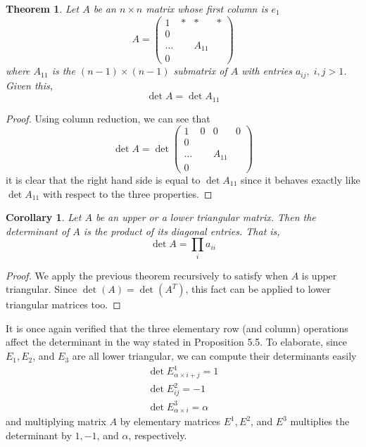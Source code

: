 \documentclass{article}
\newtheorem{theorem}{Theorem}[section]
\newtheorem{corollary}{Corollary}[theorem]
\theoremstyle{remark}
\theoremstyle{definition}
\begin{document}
\begin{theorem}
Let $A$ be an $n \times n$ matrix whose first column is $e_1$
\[A = \begin{pmatrix}
1&*&*&* \\
0 &&& \\
\ldots& & A_{11}& \\
0&&&
\end{pmatrix}\]
where $A_{11}$ is the $(n-1) \times (n-1)$ submatrix of $A$ with entries $a_{i j}, \; i, j > 1$. Given this, 
\[\det{A} = \det{A_{11}}\]
\end{theorem}
\begin{proof}
Using column reduction, we can see that 
\[ \det{A} = \det{\begin{pmatrix}
1&0&0&0 \\
0 &&& \\
\ldots& & A_{11}& \\
0&&&
\end{pmatrix}}\]
it is clear that the right hand side is equal to $\det{A_{11}}$ since it behaves exactly like $\det{A_{11}}$ with respect to the three properties. 
\end{proof}

\begin{corollary}
Let $A$ be an upper or a lower triangular matrix. Then the determinant of $A$ is the product of its diagonal entries. That is,  
\[ \det{A} = \prod_{i} a_{i i}\]
\end{corollary}
\begin{proof}
We apply the previous theorem recursively to satisfy when $A$ is upper triangular. Since $\det{(A)} = \det{(A^T)}$, this fact can be applied to lower triangular matrices too. 
\end{proof}

It is once again verified that the three elementary row (and column) operations affect the determinant in the way stated in Proposition 5.5. To elaborate, since $E_1, E_2$, and $E_3$ are all lower triangular, we can compute their determinants easily
\begin{align*}
    \det{E^1_{\alpha \times i + j}} = 1 \\
    \det{E^2_{i j}} = -1 \\
    \det{E^3_{\alpha \times i}} = \alpha
\end{align*}
and multiplying matrix $A$ by elementary matrices $E^1, E^2$, and $E^3$ multiplies the determinant by $1, -1$, and $\alpha$, respectively. 
\end{document}
